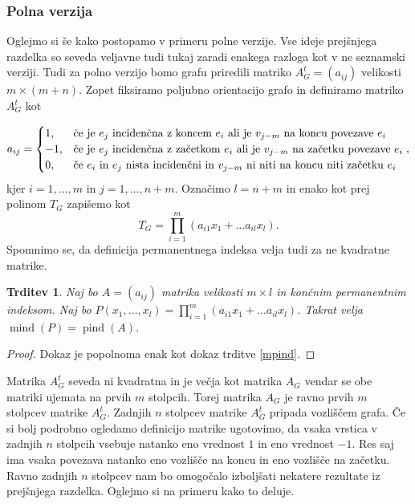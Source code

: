 \documentclass[12pt,a4paper,twoside]{article}
\theoremstyle{definition} %
\theoremstyle{plain} %
\newtheorem{trditev}[definicija]{Trditev}
\numberwithin{equation}{section}  %
\DeclareMathOperator{\mind}{mind}
\DeclareMathOperator{\pind}{pind}
\begin{document}
\subsubsection{Polna verzija}
Oglejmo si še kako postopamo v primeru polne verzije. Vse ideje prejšnjega razdelka so seveda veljavne tudi tukaj zaradi enakega razloga kot v ne seznamski verziji. Tudi za polno verzijo bomo grafu priredili matriko $A_G^t = (a_{ij})$ velikosti $m \times (m+n)$. Zopet fiksiramo poljubno orientacijo grafo in definiramo matriko $A_G^t$ kot

\begin{equation*}
a_{ij} = 
\begin{cases}

1, & \text{če je $e_j$ incidenčna z koncem $e_i$ ali je $v_{j-m}$ na koncu povezave $e_i$}\\ 
	-1, & \text{če je $ e_j$ incidenčna z začetkom  $e_i$ ali je $v_{j-m}$ na začetku povezave $e_i$} \\

0, & \text{če $e_i$ in $e_j$ nista incidenčni in $v_{j-m}$ ni niti na koncu niti začetku $e_i$}
\end{cases},
\end{equation*}
kjer $i=1,\ldots, m$ in $j=1, \ldots, n+m$. Označimo $l=n+m$ in enako kot prej  polinom $T_G$ zapišemo kot 
$$T_G = \prod_{i=1}^m (a_{i1}x_1 + \ldots a_{il}x_l).$$
Spomnimo se, da definicija permanentnega indeksa velja tudi za ne kvadratne matrike.
\begin{trditev}
Naj bo $A = (a_{ij})$  matrika velikosti $m \times l$ in končnim permanentnim indeksom. Naj bo $P(x_1, \ldots, x_l) = \prod_{i=1}^m (a_{i1}x_1 + \ldots a_{il}x_l)$. Takrat velja $\mind(P) = \pind(A)$.
\end{trditev}
\begin{proof}
Dokaz je popolnoma enak kot dokaz trditve \ref{mpind}.
\end{proof}
Matrika $A_G^t$ seveda ni kvadratna in je večja kot matrika $A_G$ vendar se obe matriki ujemata na prvih $m$ stolpcih. Torej matrika $A_G$ je ravno prvih $m$ stolpcev matrike $A_G^t$. Zadnjih $n$ stolpcev matrike $A_G^t$ pripada vozliščem grafa. Če si bolj podrobno ogledamo definicijo matrike ugotovimo, da vsaka vrstica v zadnjih $n$ stolpcih vsebuje natanko eno vrednost $1$ in eno vrednost $-1$. Res saj ima vsaka povezava natanko eno vozlišče na koncu in eno vozlišče na začetku. Ravno zadnjih $n$ stolpcev nam bo omogočalo izboljšati nekatere rezultate iz prejšnjega razdelka. Oglejmo si na primeru kako to deluje.
\end{document}
